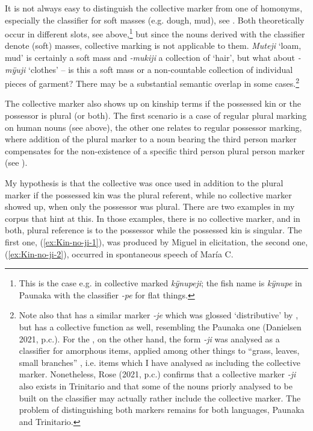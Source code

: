 It is not always easy to distinguish the collective marker from one of homo\-nyms, especially the classifier for soft masses (e.g. dough, mud), see . Both theoretically occur in different slots, see  above,\footnote{This is the case e.g. in collective marked \textit{kÿnupeji}; the fish name is \textit{kÿnupe} in Paunaka %
 with the classifier \textit{-pe} for flat things.} but since the nouns derived with the classifier denote (soft) masses, collective marking is not applicable to them. \textit{Muteji} ‘loam, mud’ is certainly a soft mass and \textit{-mukiji} a collection of ‘hair’, but what about \textit{-mÿuji} ‘clothes’ – is this a soft mass or a non-countable collection of individual pieces of garment? There may be a substantial semantic overlap in some cases.\footnote{Note also that  has a similar marker \textit{-je} which was glossed ‘distributive’ by \citet[155--156]{Danielsen2007}, but has a collective function as well, resembling the Paunaka one (Danielsen 2021, p.c.). For the , on the other hand, the form \textit{-ji} was analysed as a classifier for amorphous items, applied among other things to “grass, leaves, small branches” \citep[17]{Rose2020}, i.e. items which I have analysed as including the collective marker. Nonetheless, Rose (2021, p.c.) confirms that a collective marker \textit{-ji} also exists in Trinitario and that some of the nouns priorly analysed to be built on the classifier may actually rather include the collective marker. The problem of distinguishing both markers remains for both languages, Paunaka and Trinitario.}

The collective marker also shows up on kinship terms if the possessed kin or the possessor is plural (or both). The first scenario is a case of regular plural marking on human nouns (see  above), the other one relates to regular possessor marking, where addition of the plural marker to a noun bearing the third person marker compensates for the non-existence of a specific third person plural person marker (see ).

My hypothesis is that the collective was once used in addition to the plural marker if the possessed kin was the plural referent, while no collective marker showed up, when only the possessor was plural. There are two examples in my corpus that hint at this. In those examples, there is no collective marker, and in both, plural reference is to the possessor while the possessed kin is singular. The first one, (\ref{ex:Kin-no-ji-1}), was produced by Miguel in elicitation, the second one, (\ref{ex:Kin-no-ji-2}), occurred in spontaneous speech of María C.

